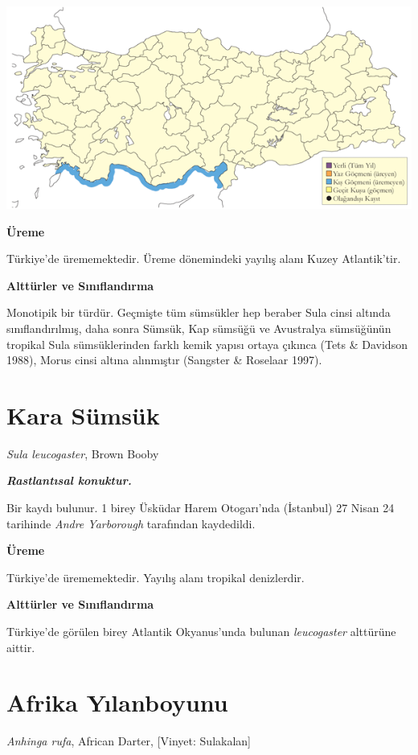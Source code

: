 \documentclass[
  letterpaper,
  DIV=11,
  numbers=noendperiod]{scrreprt}
\begin{document}
\includegraphics{images/harita_Page_076.png}

\textbf{Üreme}

Türkiye'de ürememektedir. Üreme dönemindeki yayılış alanı Kuzey
Atlantik'tir.

\textbf{Alttürler ve Sınıflandırma}

Monotipik bir türdür. Geçmişte tüm sümsükler hep beraber Sula cinsi
altında sınıflandırılmış, daha sonra Sümsük, Kap sümsüğü ve Avustralya
sümsüğünün tropikal Sula sümsüklerinden farklı kemik yapısı ortaya
çıkınca (Tets \& Davidson 1988), Morus cinsi altına alınmıştır (Sangster
\& Roselaar 1997).

\section{Kara Sümsük}\label{kara-suxfcmsuxfck}

\emph{Sula leucogaster}, Brown Booby

\textbf{\emph{Rastlantısal konuktur.}}

Bir kaydı bulunur. 1 birey Üsküdar Harem Otogarı'nda (İstanbul) 27 Nisan
24 tarihinde \emph{Andre Yarborough} tarafından kaydedildi.

\textbf{Üreme}

Türkiye'de ürememektedir. Yayılış alanı tropikal denizlerdir.

\textbf{Alttürler ve Sınıflandırma}

Türkiye'de görülen birey Atlantik Okyanus'unda bulunan
\emph{leucogaster} alttürüne aittir.

\section{Afrika Yılanboyunu}\label{afrika-yux131lanboyunu}

\emph{Anhinga rufa}, African Darter, {[}Vinyet: Sulakalan{]}
\end{document}
